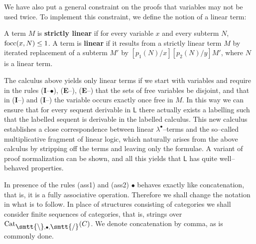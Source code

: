 We have also put a general constraint on the proofs that variables
may not be used twice. To implement this constraint, we define the
notion of a linear term:
\begin{defn}
A term $M$ is \textbf{strictly linear} if for every variable 
$x$ and every subterm $N$, $\operatorname{focc}(x,N) \leq 1$. A term is \textbf{linear} 
if it results from a strictly linear term $M$ by iterated 
replacement of a subterm $M'$ by $[p_1(N)/x][p_2(N)/y]M'$, 
where $N$ is a linear term.
\end{defn}
The calculus above yields only linear terms if we start with 
variables and require in the rules (\textbf{I}--$\bullet$), 
(\textbf{E}--{\mtt{\tf}}), (\textbf{E}--{\mtt{\tb}}) that the 
sets of free variables be disjoint, and that in 
(\textbf{I}--{\mtt{\tf}}) and (\textbf{I}--{\mtt{\tb}}) the
variable occurs exactly once free in $M$. In this way we can 
ensure that for every sequent derivable in $\mathsf{L}$ there 
actually exists a labelling such that the labelled sequent is 
derivable in the labelled
calculus. This new calculus establishes a close correspondence
between linear $\lambda^{\bullet}$--terms and the so--called
multiplicative fragment of linear logic, which naturally arises
from the above calculus by stripping off the terms and leaving
only the formulae. A variant of proof normalization can be shown,
and all this yields that $\mathsf{L}$ has quite well--behaved
properties.

In presence of the rules (ass1) and (ass2) $\bullet$ behaves exactly
like concatenation, that is, it is a fully associative operation.
Therefore we shall change the notation in what is to follow. In
place of structures consisting of categories we shall consider
finite sequences of categories, that is, strings over 
$\Cat_{\mbox{\smtt{\tb}}, \bullet, \mbox{\smtt{\tf}}}(C)$. 
We denote concatenation by comma, as is commonly done.

